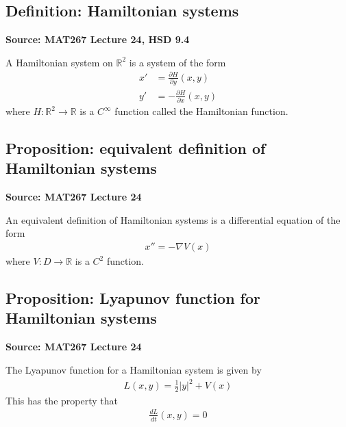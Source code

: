\documentclass[11pt]{article}
\newcommand{\R}{\mathbb{R}}
\begin{document}
\subsection{Definition: Hamiltonian systems}
\textbf{Source: MAT267 Lecture 24, HSD 9.4}

A Hamiltonian system on $\R^2$ is a system of the form 
\begin{align*}
    x' &= \frac{\partial H}{\partial y}(x,y) \\
    y' &= - \frac{\partial H}{\partial x}(x,y) 
\end{align*}
where $H: \R^2 \to \R$ is a $C^\infty$ function called the Hamiltonian function.

\subsection{Proposition: equivalent definition of Hamiltonian systems}
\textbf{Source: MAT267 Lecture 24}

An equivalent definition of Hamiltonian systems is a differential equation of the form 
\begin{align*}
    x'' = - \nabla V(x) 
\end{align*}
where $V: D \to \R$ is a $C^2$ function. 

\subsection{Proposition: Lyapunov function for Hamiltonian systems}
\textbf{Source: MAT267 Lecture 24}

The Lyapunov function for a Hamiltonian system is given by 
\begin{align*}
    L(x,y) = \frac{1}{2}|y|^2 + V(x) 
\end{align*}
This has the property that 
\begin{align*}
    \frac{dL}{dt}(x,y) = 0 
\end{align*}
\end{document}
